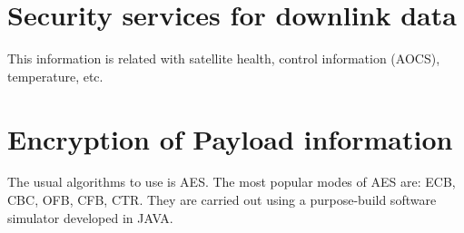 \documentclass[12pt,a4paper]{report}
\begin{document}
\section{Security services for downlink data}
This information is related with satellite health, control information (AOCS), temperature, etc.
\section{Encryption of Payload information}
The usual algorithms to use is AES. The most popular modes of AES are: ECB, CBC, OFB, CFB, CTR. They are carried out using a purpose-build software simulator developed in JAVA. 


\end{document}
